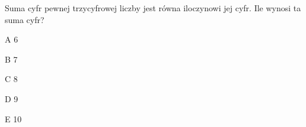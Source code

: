 \begin{tresc}
Suma cyfr pewnej trzycyfrowej liczby jest równa iloczynowi jej cyfr. Ile wynosi ta suma cyfr?
\end{tresc}
\begin{wariant}{A} 6 \end{wariant}
\begin{wariant}{B} 7 \end{wariant}
\begin{wariant}{C} 8 \end{wariant}
\begin{wariant}{D} 9 \end{wariant}
\begin{wariant}{E} 10 \end{wariant}
